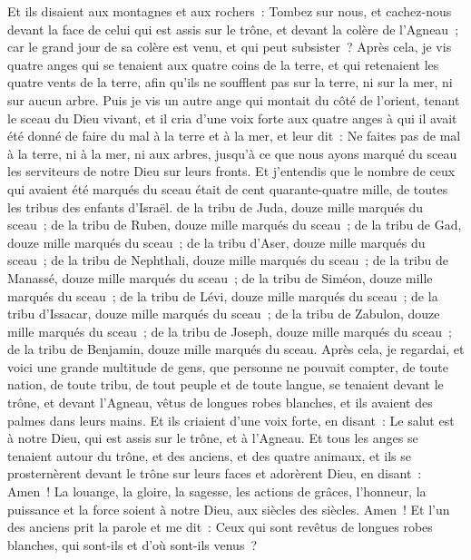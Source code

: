 \begin{multicols}{2}
Et ils disaient aux montagnes et aux rochers~: Tombez sur nous, et cachez-nous devant la face de celui qui est assis sur le trône, et devant la colère de l'Agneau~;
car le grand jour de sa colère est venu, et qui peut subsister~?
\VerseOne{}Après cela, je vis quatre anges qui se tenaient aux quatre coins de la terre, et qui retenaient les quatre vents de la terre, afin qu'ils ne soufflent pas sur la terre, ni sur la mer, ni sur aucun arbre.
Puis je vis un autre ange qui montait du côté de l'orient, tenant le sceau du Dieu vivant, et il cria d'une voix forte aux quatre anges à qui il avait été donné de faire du mal à la terre et à la mer,
et leur dit~: Ne faites pas de mal à la terre, ni à la mer, ni aux arbres, jusqu'à ce que nous ayons marqué du sceau les serviteurs de notre Dieu sur leurs fronts.
Et j'entendis que le nombre de ceux qui avaient été marqués du sceau était de cent quarante-quatre mille, de toutes les tribus des enfants d'Israël.
de la tribu de Juda, douze mille marqués du sceau~; de la tribu de Ruben, douze mille marqués du sceau~; de la tribu de Gad, douze mille marqués du sceau~;
de la tribu d'Aser, douze mille marqués du sceau~; de la tribu de Nephthali, douze mille marqués du sceau~; de la tribu de Manassé, douze mille marqués du sceau~;
de la tribu de Siméon, douze mille marqués du sceau~; de la tribu de Lévi, douze mille marqués du sceau~; de la tribu d'Issacar, douze mille marqués du sceau~;
de la tribu de Zabulon, douze mille marqués du sceau~; de la tribu de Joseph, douze mille marqués du sceau~; de la tribu de Benjamin, douze mille marqués du sceau.
Après cela, je regardai, et voici une grande multitude de gens, que personne ne pouvait compter, de toute nation, de toute tribu, de tout peuple et de toute langue, se tenaient devant le trône, et devant l'Agneau, vêtus de longues robes blanches, et ils avaient des palmes dans leurs mains.
Et ils criaient d'une voix forte, en disant~: Le salut est à notre Dieu, qui est assis sur le trône, et à l'Agneau.
Et tous les anges se tenaient autour du trône, et des anciens, et des quatre animaux, et ils se prosternèrent devant le trône sur leurs faces et adorèrent Dieu,
en disant~: Amen~! La louange, la gloire, la sagesse, les actions de grâces, l'honneur, la puissance et la force soient à notre Dieu, aux siècles des siècles. Amen~!
Et l'un des anciens prit la parole et me dit~: Ceux qui sont revêtus de longues robes blanches, qui sont-ils et d'où sont-ils venus~?

\end{multicols}

